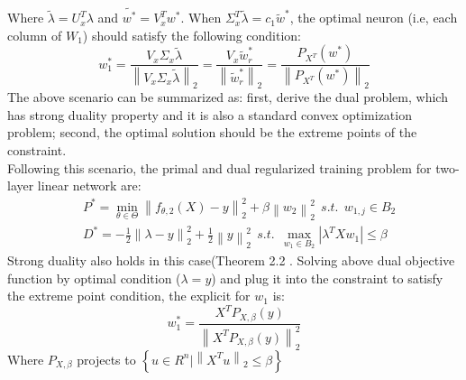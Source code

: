 \documentclass{article}
\begin{document}
Where $\widetilde{\lambda}=U_x^T\lambda$ and $\widetilde{w^*}=V_x^T w^*$. When $\Sigma_x^T\widetilde{\lambda}=c_1\widetilde{w}^*$, the optimal neuron (i.e, each column of $W_1$) should satisfy the following condition:
\begin{equation}
    w_1^*=\frac{V_x\Sigma_x \widetilde{\lambda}}{\left \| V_x \Sigma_x\widetilde{\lambda} \right \|_2}=\frac{V_x\widetilde{w}_r^*}{\left \| \widetilde{w}_r^* \right \|_2}=\frac{P_{X^T}(w^*)}{\left \| P_{X^T}(w^*) \right \|_2}
\end{equation}
The above scenario can be summarized as: first, derive the dual problem, which has strong duality property and it is also a standard convex optimization problem; second, the optimal solution should be the extreme points of the constraint.\\
Following this scenario, the primal and dual regularized training problem for two-layer linear network are:
\begin{equation}
    \begin{aligned}
    &P^*=\min_{\theta \in \Theta} \left \|f_{\theta,2}(X)-y\right \|_2^2+\beta\left \| w_2 \right \|_2^2 \ \ s.t.\ \ w_{1,j}\in B_2\\
    &D^*=-\frac{1}{2}\left \| \lambda-y \right \|_2^2+\frac{1}{2}\left \| y \right \|_2^2 \ \ s.t. \ \ \max_{w_1 \in B_2}\left | \lambda^TXw_1 \right |\leq \beta
    \end{aligned}
\end{equation}
Strong duality also holds in this case(Theorem 2.2 \cite{cvxduality1}. Solving above dual objective function by optimal condition ($\lambda=y$) and plug it into the constraint to satisfy the extreme point condition, the explicit for $w_1$ is:
\begin{equation}
    w_1^*=\frac{X^TP_{X,\beta}(y)}{\left \|X^TP_{X,\beta}(y)\right \|_2^2}
\end{equation}
Where $P_{X,\beta}$ projects to $\left \{ u\in R^n | \left \| X^Tu \right \|_2 \leq \beta \right \}$
\end{document}
